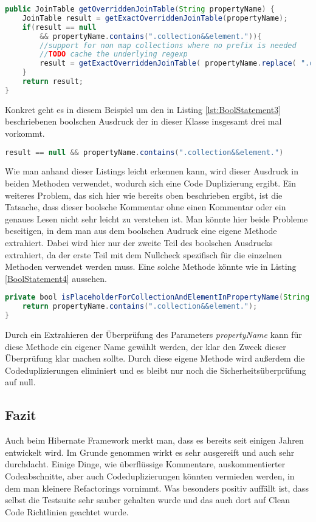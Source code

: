 \begin{lstlisting}[language=Java, caption=Komplexe boolsche Ausdrücke 2 Zeile 305 - 313, label=lst:BoolStatement2]
public JoinTable getOverriddenJoinTable(String propertyName) {
	JoinTable result = getExactOverriddenJoinTable(propertyName);
	if(result == null 
		&& propertyName.contains(".collection&&element.")){
		//support for non map collections where no prefix is needed
		//TODO cache the underlying regexp
		result = getExactOverriddenJoinTable( propertyName.replace( ".collection&&element.", "."  ) );
	}
	return result;
}
\end{lstlisting}

Konkret geht es in diesem Beispiel um den in Listing \ref{lst:BoolStatement3} beschriebenen boolschen Ausdruck der in dieser Klasse insgesamt drei mal vorkommt.

\begin{lstlisting}[language=Java, caption=Boolscher Audruck, label=lst:BoolStatement3]
result == null && propertyName.contains(".collection&&element.")
\end{lstlisting}

Wie man anhand dieser Listings leicht erkennen kann, wird dieser Ausdruck in beiden Methoden verwendet, wodurch sich eine Code Duplizierung ergibt. Ein weiteres Problem, das sich hier wie bereits oben beschrieben ergibt, ist die Tatsache, dass dieser boolsche Kommentar ohne einen Kommentar oder ein genaues Lesen nicht sehr leicht zu verstehen ist. Man könnte hier beide Probleme beseitigen, in dem man aus dem boolschen Audruck eine eigene Methode extrahiert. Dabei wird hier nur der zweite Teil des boolschen Ausdrucks extrahiert, da der erste Teil mit dem Nullcheck spezifisch für die einzelnen Methoden verwendet werden muss. Eine solche Methode könnte wie in Listing \ref{BoolStatement4} aussehen.

\begin{lstlisting}[language=Java, caption=Boolscher Ausdruck neu, label=lst:BoolStatement4]
private bool isPlaceholderForCollectionAndElementInPropertyName(String propertyName) {
	return propertyName.contains(".collection&&element.");
}
\end{lstlisting}

Durch ein Extrahieren der Überprüfung des Parameters \textit{propertyName} kann für diese Methode ein eigener Name gewählt werden, der klar den Zweck dieser Überprüfung klar machen sollte. Durch diese eigene Methode wird außerdem die Codeduplizierungen eliminiert und es bleibt nur noch die Sicherheitsüberprüfung auf null.

\subsection{Fazit}
Auch beim Hibernate Framework merkt man, dass es bereits seit einigen Jahren entwickelt wird. Im Grunde genommen wirkt es sehr ausgereift und auch sehr durchdacht. Einige Dinge, wie überflüssige Kommentare, auskommentierter Codeabschnitte, aber auch Codeduplizierungen könnten vermieden werden, in dem man kleinere Refactorings vornimmt. Was besonders positiv auffällt ist, dass selbst die Testsuite sehr sauber gehalten wurde und das auch dort auf Clean Code Richtlinien geachtet wurde. 
